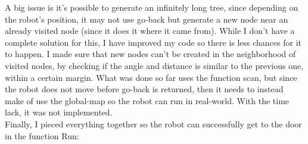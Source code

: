 \documentclass{article}
\begin{document}
A big issue is it's possible to generate an infinitely long tree, since depending on the robot's position, it may not use go-back but generate a new node near an already visited node (since it does it where it came from). While I don't have a complete solution for this, I have improved my code so there is less chances for it to happen. I made sure that new nodes can't be created in the neighborhood of visited nodes, by checking if the angle and distance is similar to the previous one, within a certain margin. What was done so far uses the function scan, but since the robot does not move before go-back is returned, then it needs to instead make of use the global-map so the robot can run in real-world. With the time lack, it was not implemented. \\

Finally, I pieced everything together so the robot can successfully get to the door in the function Run:
\end{document}
